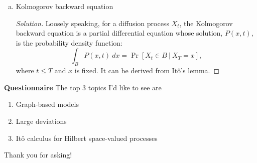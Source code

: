 \documentclass[11pt,letterpaper]{report}
\newenvironment{solution}
{\begin{proof}[Solution]}
{\end{proof}}
\begin{document}
\begin{enumerate}[(a)]
	\item Kolmogorov backward equation
	\begin{solution}
		Loosely speaking, for a diffusion process $X_t$, the Kolmogorov backward equation is a partial differential equation whose solution, $P(x, t)$, is the probability density function:
		\[
		\int_BP(x, t)\ dx = \Pr[X_t\in B\ |\ X_T = x],
		\]
		where $t\leq T$ and $x$ is fixed. It can be derived from It\^o's lemma.
	\end{solution}
\end{enumerate}

\noindent\textbf{Questionnaire}
The top 3 topics I'd like to see are
\begin{enumerate}
	\item Graph-based models
	\item Large deviations
	\item It\^o calculus for Hilbert space-valued processes
\end{enumerate}
Thank you for asking!
\end{document}
